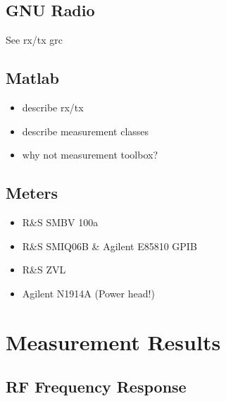 \documentclass[12pt,a4paper,parskip=full]{scrartcl}
\begin{document}
\subsection{GNU Radio}
See rx/tx grc
\subsection{Matlab}
\begin{itemize}
    \item describe rx/tx
    \item describe measurement classes
    \item why not measurement toolbox?
\end{itemize}
\subsection{Meters}
\begin{itemize}
    \item R\&S SMBV 100a
    \item R\&S SMIQ06B \& Agilent E85810 GPIB
    \item R\&S ZVL
    \item Agilent N1914A (Power head!)
\end{itemize}
\section{Measurement Results}
\subsection{RF Frequency Response}
\end{document}
